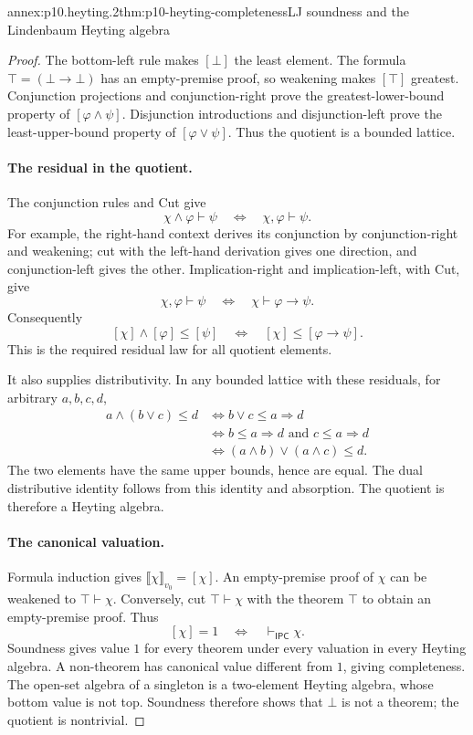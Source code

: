 \begin{annexitem}{annex:p10.heyting.2}{thm:p10-heyting-completeness}{LJ soundness and the Lindenbaum Heyting algebra}
\begin{proof}
The bottom-left rule makes \([\bot]\) the least element.
The formula \(\top=(\bot\to\bot)\) has an empty-premise proof,
so weakening makes \([\top]\) greatest.
Conjunction projections and conjunction-right prove the
greatest-lower-bound property of \([\varphi\land\psi]\).
Disjunction introductions and disjunction-left prove the
least-upper-bound property of \([\varphi\lor\psi]\).
Thus the quotient is a bounded lattice.

\paragraph{The residual in the quotient.}
The conjunction rules and Cut give
\[
 \chi\land\varphi\vdash\psi
       \quad\Longleftrightarrow\quad
 \chi,\varphi\vdash\psi.
\]
For example, the right-hand context derives its conjunction
by conjunction-right and weakening; cut with the left-hand
derivation gives one direction, and conjunction-left gives
the other.
Implication-right and implication-left, with Cut, give
\[
 \chi,\varphi\vdash\psi
       \quad\Longleftrightarrow\quad
 \chi\vdash\varphi\to\psi.
\]
Consequently
\[
 [\chi]\wedge[\varphi]\leq[\psi]
       \quad\Longleftrightarrow\quad
 [\chi]\leq[\varphi\to\psi].
\]
This is the required residual law for all quotient elements.

It also supplies distributivity.  In any bounded lattice
with these residuals, for arbitrary \(a,b,c,d\),
\[
\begin{aligned}
 a\wedge(b\vee c)\leq d
 &\Longleftrightarrow b\vee c\leq a\Rightarrow d\\
 &\Longleftrightarrow
       b\leq a\Rightarrow d\text{ and }c\leq a\Rightarrow d\\
 &\Longleftrightarrow
       (a\wedge b)\vee(a\wedge c)\leq d.
\end{aligned}
\]
The two elements have the same upper bounds, hence are equal.
The dual distributive identity follows from this identity
and absorption.  The quotient is therefore a Heyting algebra.

\paragraph{The canonical valuation.}
Formula induction gives
\(\llbracket\chi\rrbracket_{v_0}=[\chi]\).
An empty-premise proof of \(\chi\) can be weakened to
\(\top\vdash\chi\).
Conversely, cut \(\top\vdash\chi\) with the theorem \(\top\)
to obtain an empty-premise proof.
Thus
\[
 [\chi]=1\quad\Longleftrightarrow\quad
 \vdash_{\mathsf{IPC}}\chi.
\]
Soundness gives value \(1\) for every theorem under every
valuation in every Heyting algebra.
A non-theorem has canonical value different from \(1\),
giving completeness.
The open-set algebra of a singleton is a two-element Heyting
algebra, whose bottom value is not top.  Soundness therefore shows
that \(\bot\) is not a theorem; the quotient is nontrivial.


\end{proof}
\end{annexitem}

